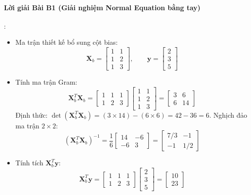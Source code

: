 \paragraph{Lời giải Bài B1 (Giải nghiệm Normal Equation bằng tay)}:
\begin{itemize}
  \item[a)] Ma trận thiết kế bổ sung cột bias:
  \begin{equation*}
  \mathbf{X}_b = \begin{bmatrix} 1 & 1 \\ 1 & 2 \\ 1 & 3 \end{bmatrix}, \qquad \mathbf{y} = \begin{bmatrix} 2 \\ 3 \\ 5 \end{bmatrix}
  \end{equation*}
  \item[b)] Tính ma trận Gram:
  \begin{equation*}
  \mathbf{X}_b^T \mathbf{X}_b = \begin{bmatrix} 1 & 1 & 1 \\ 1 & 2 & 3 \end{bmatrix} \begin{bmatrix} 1 & 1 \\ 1 & 2 \\ 1 & 3 \end{bmatrix} = \begin{bmatrix} 3 & 6 \\ 6 & 14 \end{bmatrix}
  \end{equation*}
  Định thức: $\det(\mathbf{X}_b^T \mathbf{X}_b) = (3 \times 14) - (6 \times 6) = 42 - 36 = 6$.
  Nghịch đảo ma trận $2 \times 2$:
  \begin{equation*}
  (\mathbf{X}_b^T \mathbf{X}_b)^{-1} = \frac{1}{6} \begin{bmatrix} 14 & -6 \\ -6 & 3 \end{bmatrix} = \begin{bmatrix} 7/3 & -1 \\ -1 & 1/2 \end{bmatrix}
  \end{equation*}
  \item[c)] Tính tích $\mathbf{X}_b^T \mathbf{y}$:
  \begin{equation*}
  \mathbf{X}_b^T \mathbf{y} = \begin{bmatrix} 1 & 1 & 1 \\ 1 & 2 & 3 \end{bmatrix} \begin{bmatrix} 2 \\ 3 \\ 5 \end{bmatrix} = \begin{bmatrix} 10 \\ 23 \end{bmatrix}

\end{equation*}
\end{itemize}
